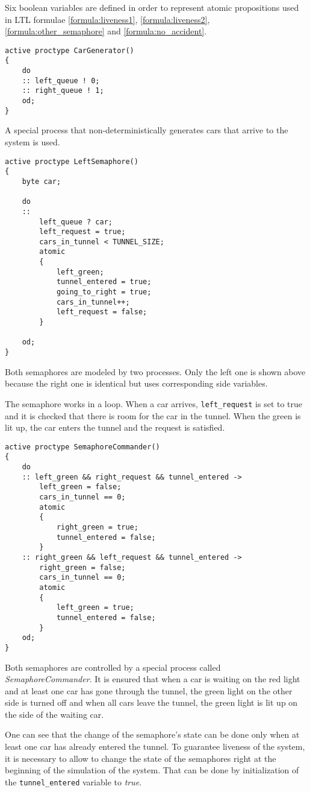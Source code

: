Six boolean variables are defined in order to represent atomic propositions used in LTL formulae \ref{formula:liveness1}, \ref{formula:liveness2}, \ref{formula:other_semaphore} and \ref{formula:no_accident}.

\begin{lstlisting}[name=construction]
active proctype CarGenerator()
{
	do
	:: left_queue ! 0;
	:: right_queue ! 1;
	od;
}
\end{lstlisting}

A special process that non-deterministically generates cars that arrive to the system is used.

\begin{lstlisting}[name=construction]
active proctype LeftSemaphore()
{
	byte car;

	do
	::
		left_queue ? car;
		left_request = true;
		cars_in_tunnel < TUNNEL_SIZE;
		atomic
		{
			left_green;
			tunnel_entered = true;
			going_to_right = true;
			cars_in_tunnel++;
			left_request = false;
		}

	od;
}
\end{lstlisting}

Both semaphores are modeled by two processes. Only the left one is shown above because the right one is identical but uses corresponding side variables.

The semaphore works in a loop. When a car arrives, \verb|left_request| is set to true and it is checked that there is room for the car in the tunnel. When the green is lit up, the car enters the tunnel and the request is satisfied.

\begin{lstlisting}[name=construction]
active proctype SemaphoreCommander()
{
	do
	:: left_green && right_request && tunnel_entered ->
		left_green = false;
		cars_in_tunnel == 0;
		atomic
		{
			right_green = true;
			tunnel_entered = false;
		}
	:: right_green && left_request && tunnel_entered ->
		right_green = false;
		cars_in_tunnel == 0;
		atomic
		{
			left_green = true;
			tunnel_entered = false;
		}
	od;
}
\end{lstlisting}

Both semaphores are controlled by a special process called \emph{SemaphoreCommander}. It is ensured that when a car is waiting on the red light and at least one car has gone through the tunnel, the green light on the other side is turned off and when all cars leave the tunnel, the green light is lit up on the side of the waiting car.

One can see that the change of the semaphore's state can be done only when at least one car has already entered the tunnel. To guarantee liveness of the system, it is necessary to allow to change the state of the semaphores right at the beginning of the simulation of the system. That can be done by initialization of the \verb|tunnel_entered| variable to \emph{true}.


